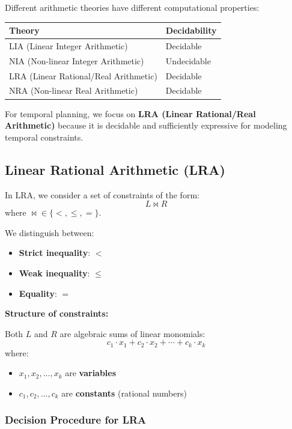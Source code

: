 \documentclass[11pt,a4paper]{article}
\theoremstyle{definition}
\theoremstyle{plain}
\theoremstyle{remark}
\begin{document}
Different arithmetic theories have different computational properties:

\begin{center}
\begin{tabular}{|l|l|}
\hline
\textbf{Theory} & \textbf{Decidability} \\
\hline
LIA (Linear Integer Arithmetic) & Decidable \\
NIA (Non-linear Integer Arithmetic) & Undecidable \\
LRA (Linear Rational/Real Arithmetic) & Decidable \\
NRA (Non-linear Real Arithmetic) & Decidable \\
\hline
\end{tabular}
\end{center}

For temporal planning, we focus on \textbf{LRA (Linear Rational/Real Arithmetic)} because it is decidable and sufficiently expressive for modeling temporal constraints.

\subsection{Linear Rational Arithmetic (LRA)}

In LRA, we consider a set of constraints of the form:
\[
L \bowtie R
\]
where $\bowtie \in \{<, \leq, =\}$.

We distinguish between:
\begin{itemize}
    \item \textbf{Strict inequality}: $<$
    \item \textbf{Weak inequality}: $\leq$
    \item \textbf{Equality}: $=$
\end{itemize}

\textbf{Structure of constraints:}

Both $L$ and $R$ are algebraic sums of linear monomials:
\[
c_1 \cdot x_1 + c_2 \cdot x_2 + \cdots + c_k \cdot x_k
\]
where:
\begin{itemize}
    \item $x_1, x_2, \ldots, x_k$ are \textbf{variables}
    \item $c_1, c_2, \ldots, c_k$ are \textbf{constants} (rational numbers)
\end{itemize}

\subsubsection{Decision Procedure for LRA}
\end{document}
